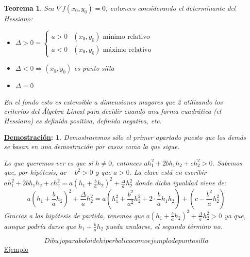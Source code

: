 \documentclass[10pt,a4paper,openright]{book}
\theoremstyle{break}
\newtheorem*{theo}{Teorema}
\newtheorem*{demo}{\underline{Demostración}:}
\begin{document}
\begin{theo}
Sea $\nabla f (x_0, y_0) = 0$, entonces considerando el determinante del Hessiano:
\begin{itemize}
\item $\Delta > 0 = \begin{cases} a > 0 & (x_0, y_0) \mbox{ mínimo relativo} \\ a < 0 & (x_0, y_0) \mbox{ máximo relativo}\end{cases}$
\item $\Delta < 0 \Rightarrow (x_0, y_0)$ es punto silla
\item $\Delta = 0$
\end{itemize}
En el fondo esto es extensible a dimensiones mayores que 2 utilizando los criterios del Álgebra Lineal para decidir cuando una forma cuadrática (el Hessiano) es definida positiva, definida negativa, etc.
\end{theo}

\begin{demo}
Demostraremos sólo el primer apartado puesto que los demás se basan en una demostración por casos como la que sigue.

Lo que queremos ver es que si $h \neq 0$, entonces $ah_1^2 + 2bh_1h_2 + ch_2^2 > 0$. Sabemos que, por hipótesis, $ac - b^2 > 0$ y que $a > 0$. La clave está en escribir $ah_1^2 + 2bh_1h_2 + ch_2^2 = a \left( h_1 + \frac{b}{a} h_2 \right)^2 + \frac{\Delta}{a} h_2^2$ donde dicha igualdad viene de:
$$ a \left( h_1 + \frac{b}{a} h_2 \right)^2 + \frac{\Delta}{a} h_2^2 = a \left( h_1^2 + \frac{b^2}{a^2} h_2^2 + 2 \cdot \frac{b}{a} h_1 h_2\right) + \left( c - \frac{b^2}{a} h_2^2 \right)$$
Gracias a las hipótesis de partida, tenemos que $ a \left( h_1 + \frac{b}{a} h_2 \right)^2 + \frac{\Delta}{a} h_2^2 >0 $ ya que, aunque podría darse que $ h_1 + \frac{b}{a} h_2 $ pueda anularse, el segundo término no.
\end{demo}

$$Dibujo paraboloide hiperbolico como ejemplo de punto silla$$
\underline{Ejemplo}
\end{document}
